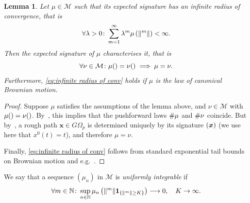 \documentclass[11pt, letterpaper]{article}
\let\sig\relax
\DeclareMathOperator{\sig}{S}
\newtheorem{lemma}{Lemma}
\theoremstyle{definition}
\theoremstyle{remark}
\newcommand{\N}{\mathbb{N}}
\newcommand{\ind}{\boldsymbol{1}}
\begin{document}
\begin{appendices}
\begin{lemma}\label{lem:expsig characteristic}
    Let $\mu \in \mathcal{M}$ such that its expected signature has an infinite radius of convergence, that is 
    \begin{equation}\label{eq:infinite radius of conv}
    \forall \lambda > 0\colon \sum_{m=1}^\infty \lambda^m \mu\left( \|\sig^m\|\right) < \infty.
    \end{equation}
    Then the expected signature of $\mu$ characterises it, that is 
    \begin{equation}\label{eq:exp signature characteristic}
    \forall \nu\in \mathcal{M}\colon \mu(\sig) = \nu(\sig) \implies \mu = \nu.
    \end{equation}
    Furthermore, \eqref{eq:infinite radius of conv} holds if $\mu$ is the law of canonical Brownian motion.
\end{lemma}
\begin{proof}
    Suppose $\mu$ satisfies the assumptions of the lemma above, and $\nu \in \mathcal{M}$ with $\mu(\sig) = \nu(\sig)$. By~\cite[Prop.\ 6.1]{chevyrev2016}, this implies that the pushforward laws $\sig\#\mu$ and $\sig\#\nu$ coincide. But by~\cite[Theorem 1.1]{boedihardjo2016}, a rough path $\boldsymbol{x} \in G\Omega_p$ is determined uniquely by its signature $\sig(\boldsymbol{x})$ (we use here that $x^0(t) = t$), and therefore $\mu = \nu$.

    Finally, \eqref{eq:infinite radius of conv} follows from standard exponential tail bounds on Brownian motion and e.g.~\cite[Theorem 6.3]{chevyrev2016}.
\end{proof}

We say that a sequence $(\mu_n)$ in $\mathcal{M}$ is \emph{uniformly integrable} if
\begin{equation}\label{eq:mu uniformly integrable}
    \forall m\in \N\colon \sup_{n\in \N} \mu_n\left( \|\sig^m\| \ind_{\{\|\sig^m\| \ge K\}}\right) \longrightarrow 0,\quad K \to \infty.
\end{equation}


\end{appendices}
\end{document}
